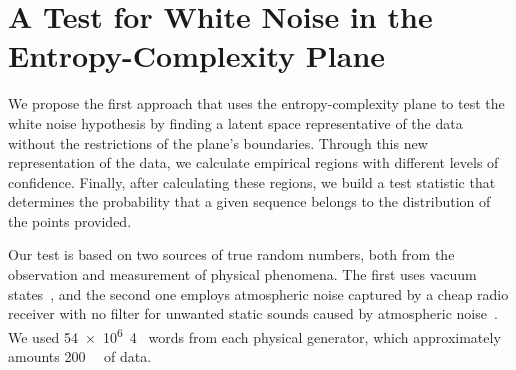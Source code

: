 \documentclass[a4,11pt]{pssbmac}
\begin{document}
	\section{A Test for White Noise in the Entropy-Complexity Plane}\label{HC-PCA}
	
	We propose the first approach that uses the entropy-complexity plane to test the white noise hypothesis by finding a latent space representative of the data without the restrictions of the plane's boundaries.
	Through this new representation of the data, we calculate empirical regions with different levels of confidence.
	Finally, after calculating these regions, we build a test statistic that determines the probability that a given sequence belongs to the distribution of the points provided.
	
	Our test is based on two sources of true random numbers, both from the observation and measurement of physical phenomena.
	The first uses vacuum states~\cite{RNGVacuumStates}, and the second one employs atmospheric noise captured by a cheap radio receiver with no filter for unwanted static sounds caused by atmospheric noise~\cite{RandomOrg}.
	We used \SI{54e6}{4\byte} words from each physical generator, which approximately amounts \SI{200}{\mega\byte} of data.
	
\end{document}
